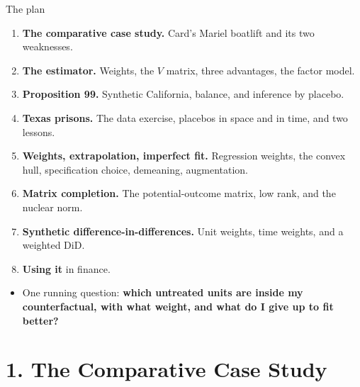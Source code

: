 \documentclass[
  11pt,
  ignorenonframetext,
  aspectratio=169,
]{beamer}
\providecommand{\tightlist}{%
  \setlength{\itemsep}{0pt}\setlength{\parskip}{0pt}}
\begin{document}
\begin{frame}{The plan}
\protect{}\label{the-plan}
\begin{enumerate}
\tightlist
\item
  \textbf{The comparative case study.} Card's Mariel boatlift and its
  two weaknesses.
\item
  \textbf{The estimator.} Weights, the \(V\) matrix, three advantages,
  the factor model.
\item
  \textbf{Proposition 99.} Synthetic California, balance, and inference
  by placebo.
\item
  \textbf{Texas prisons.} The data exercise, placebos in space and in
  time, and two lessons.
\item
  \textbf{Weights, extrapolation, imperfect fit.} Regression weights,
  the convex hull, specification choice, demeaning, augmentation.
\item
  \textbf{Matrix completion.} The potential-outcome matrix, low rank,
  and the nuclear norm.
\item
  \textbf{Synthetic difference-in-differences.} Unit weights, time
  weights, and a weighted DiD.
\item
  \textbf{Using it} in finance.
\end{enumerate}

\vspace{0.4em}

\begin{itemize}
\tightlist
\item
  One running question: \textbf{which untreated units are inside my
  counterfactual, with what weight, and what do I give up to fit
  better?}
\end{itemize}
\end{frame}

\section{1. The Comparative Case
Study}\label{the-comparative-case-study}
\end{document}
